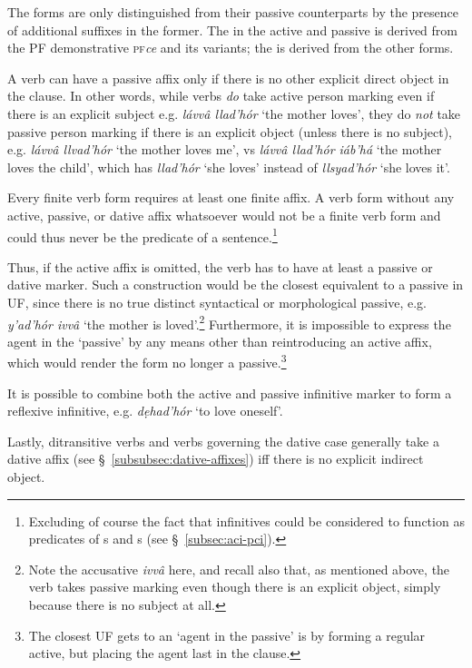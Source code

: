 \documentclass[a4paper, 12pt, twoside, final]{article}
\def\pfabbr{{\normalfont\scshape pf\space}}
\def\pf#1{\pfabbr\textit{#1}}
\let \w \textit
\begin{document}
The  forms are only distinguished from their passive counterparts by
the presence of additional suffixes in the former. The  in the active and passive is derived from the PF
demonstrative \pf{ce} and its variants; the  is derived from the other  forms.

A verb can have a passive affix only if there is no other explicit direct object in the clause. In other words, while verbs
\textit{do} take active person marking even if there is an explicit subject e.g. \w{lávvâ llad’hór} ‘the mother loves’, they do
\w{not} take passive person marking if there is an explicit object (unless there is no subject), e.g. \w{lávvâ llvad’hór} ‘the
mother loves me’, vs \w{lávvâ llad’hór iáb’há} ‘the mother loves the child’, which has \w{llad’hór} ‘she loves’ instead of
\w{llsyad’hór} ‘she loves it’.

Every finite verb form requires at least one finite affix. A verb form without any active, passive, or dative affix whatsoever
would not be a finite verb form and could thus never be the predicate of a sentence.\footnote{Excluding of course the fact
that infinitives could be considered to function as predicates of s and s (see §~\ref{subsec:aci-pci}).}

Thus, if the active affix is omitted, the verb has to have at least a passive or dative marker.
Such a construction would be the closest equivalent to a passive in UF, since there is
no true distinct syntactical or morphological passive, e.g. \w{y’ad’hór ivvâ} ‘the mother is loved’.\footnote{Note the accusative
\textit{ivvâ} here, and recall also that, as mentioned above, the verb takes passive marking even though there is an explicit
object, simply because there is no subject at all.} Furthermore, it is impossible to express the agent
in the ‘passive’ by any
means other than reintroducing an active affix, which would render the form no longer a passive.\footnote{The closest
UF gets to an ‘agent in the passive’ is by forming a regular active, but placing the agent last in the clause.}

It is possible to combine both the active and passive infinitive marker to form a reflexive infinitive, e.g. \w{dẹhad’hór}
‘to love oneself’.

Lastly, ditransitive verbs and verbs governing the dative case generally take a dative affix (see
§~\ref{subsubsec:dative-affixes}) iff there is no explicit indirect object.
\end{document}
